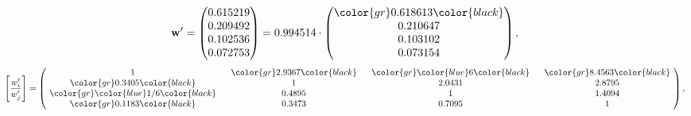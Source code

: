 \begin{example}
\begin{equation*}
\mathbf{w}^{\prime} =
\begin{pmatrix}
0.615219\\
0.209492\\
0.102536\\
0.072753
\end{pmatrix} =
0.994514\cdot
\begin{pmatrix}
\color{gr} 0.618613\color{black} \\
0.210647\\
0.103102\\
0.073154
\end{pmatrix},
\end{equation*}
\begin{equation*}
\left[ \frac{{w}^{\prime}_i}{{w}^{\prime}_j} \right] =
\begin{pmatrix}
$\,\,$ 1 $\,\,$ & $\,\,$\color{gr} 2.9367\color{black} $\,\,$ & $\,\,$\color{gr} \color{blue} 6\color{black} $\,\,$ & $\,\,$\color{gr} 8.4563\color{black} $\,\,$ \\
$\,\,$\color{gr} 0.3405\color{black} $\,\,$ & $\,\,$ 1 $\,\,$ & $\,\,$2.0431$\,\,$ & $\,\,$2.8795  $\,\,$ \\
$\,\,$\color{gr} \color{blue}  1/6\color{black} $\,\,$ & $\,\,$0.4895$\,\,$ & $\,\,$ 1 $\,\,$ & $\,\,$1.4094 $\,\,$ \\
$\,\,$\color{gr} 0.1183\color{black} $\,\,$ & $\,\,$0.3473$\,\,$ & $\,\,$0.7095$\,\,$ & $\,\,$ 1  $\,\,$ \\
\end{pmatrix},
\end{equation*}
\end{example}
\newpage
